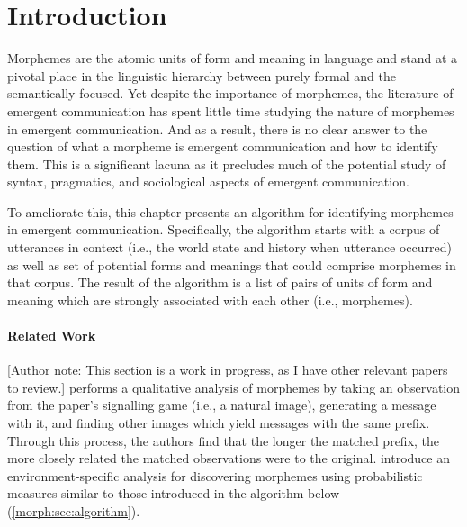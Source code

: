 \section{Introduction}
Morphemes are the atomic units of form and meaning in language and stand at a pivotal place in the linguistic hierarchy between purely formal and the semantically-focused.
Yet despite the importance of morphemes, the literature of emergent communication has spent little time studying the nature of morphemes in emergent communication.
And as a result, there is no clear answer to the question of what a morpheme is emergent communication and how to identify them.
This is a significant lacuna as it precludes much of the potential study of syntax, pragmatics, and sociological aspects of emergent communication.

To ameliorate this, this chapter presents an algorithm for identifying morphemes in emergent communication.
Specifically, the algorithm starts with a corpus of utterances in context (i.e., the world state and history when utterance occurred) as well as set of potential forms and meanings that could comprise morphemes in that corpus.
The result of the algorithm is a list of pairs of units of form and meaning which are strongly associated with each other (i.e., morphemes).



\paragraph{Related Work}
[Author note: This section is a work in progress, as I have other relevant papers to review.]
\citet{havrylov2017sequence} performs a qualitative analysis of morphemes by taking an observation from the paper's signalling game (i.e., a natural image), generating a message with it, and finding other images which yield messages with the same prefix.
Through this process, the authors find that the longer the matched prefix, the more closely related the matched observations were to the original.
\citet{lipinski2024speaking} introduce an environment-specific analysis for discovering morphemes using probabilistic measures similar to those introduced in the algorithm below (\cref{morph:sec:algorithm}).

% 
% 


